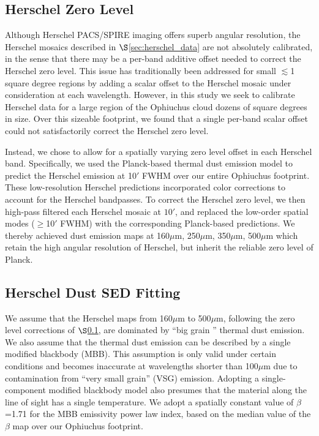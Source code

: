 \documentclass[11pt,a4paper]{emulateapj}
\begin{document}
\subsection{Herschel Zero Level}
\label{sec:zero_level}
Although Herschel PACS/SPIRE imaging offers superb angular resolution, the Herschel mosaics described in $\S$\ref{sec:herschel_data} are not absolutely calibrated, in the sense that there may be a per-band additive offset needed to correct the Herschel zero level. This issue has traditionally been addressed for small $\lesssim$1 square degree regions by adding a scalar offset to the Herschel mosaic under consideration at each wavelength. However, in this study we seek to calibrate Herschel data for a large region of the Ophiuchus cloud dozens of square degrees in size. Over this sizeable footprint, we found that a single per-band scalar offset could not satisfactorily correct the Herschel zero level.

Instead, we chose to allow for a spatially varying zero level offset in each Herschel band. Specifically, we used the \cite{Meisner_2015} Planck-based thermal dust emission model to predict the Herschel emission at 10$'$ FWHM over our entire Ophiuchus footprint. These low-resolution Herschel predictions incorporated color corrections to account for the Herschel bandpasses. To correct the Herschel zero level, we then high-pass filtered each Herschel mosaic at $10$$'$, and replaced the low-order spatial modes ($\geq$10$'$ FWHM) with the corresponding Planck-based predictions. We thereby achieved dust emission maps at 160$\mu$m, 250$\mu$m, 350$\mu$m, 500$\mu$m which retain the high angular resolution of Herschel, but inherit the reliable zero level of Planck.

\subsection{Herschel Dust SED Fitting}
\label{sec:fir_modeling}
We assume that the Herschel maps from 160$\mu$m to 500$\mu$m, following the zero level corrections of $\S$\ref{sec:zero_level}, are dominated by ``big grain \citep[BG;][]{Stepnik_2003}'' thermal dust emission. We also assume that the thermal dust emission can be described by a single modified blackbody (MBB). This assumption is only valid under certain conditions and becomes inaccurate at wavelengths shorter than 100$\mu$m due to contamination from ``very small grain'' (VSG) emission. Adopting a single-component modified blackbody model also presumes that the material along the line of sight has a single temperature. We adopt a spatially constant value of $\beta$=1.71 for the MBB emissivity power law index, based on the median value of the \cite{Planck_2014} $\beta$ map over our Ophiuchus footprint.
\end{document}
